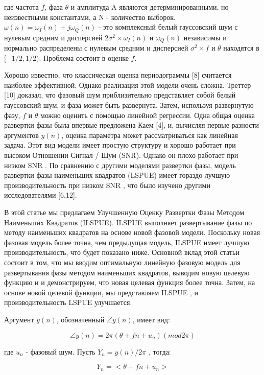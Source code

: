 где частота $f$, фаза $\theta$ и амплитуда A являются детерминированными, но неизвестными константами, а N - количество выборок. $\omega(n) = \omega_I(n) + j\omega_Q(n)$ - это комплексный белый гауссовский шум с нулевым средним и дисперсией $2\sigma^2 \times \omega_I (n)$ и $\omega_Q(n)$ независимы и нормально распределены с нулевым средним и дисперсией $\sigma^2 \times f$ и $ \theta$ находятся в $[- 1 / 2,1 / 2)$. Проблема состоит в оценке $f$.

Хорошо известно, что классическая оценка периодограммы [8] считается наиболее эффективной. Однако реализация этой модели очень сложна. Треттер [10] доказал, что фазовый шум приблизительно представляет собой белый гауссовский шум, и фаза может быть развернута. Затем, используя развернутую фазу, $f$ и $\theta$ можно оценить с помощью линейной регрессии. Одна общая оценка развертки фазы была впервые предложена Каем [4], и, вычисляя первые разности аргументов $y(n)$, оценка параметра может рассматриваться как линейная задача. Этот вид модели имеет простую структуру и хорошо работает при высоком Отношении Сигнал / Шум (SNR). Однако он плохо работает при низком SNR . По сравнению с другими моделями развертки фазы, модель развертки фазы наименьших квадратов (LSPUE) имеет гораздо лучшую производительность при низком SNR , что было изучено другими исследователями [6,12].

В этой статье мы предлагаем Улучшенную Оценку Развертки Фазы Методом Наименьших Квадратов (ILSPUE). ILSPUE выполняет
развертывание фазы по методу наименьших квадратов на основе новой фазовой модели. Поскольку новая фазовая модель более точна, чем предыдущая модель, ILSPUE  имеет лучшую производительность, что будет показано ниже. Основной вклад этой статьи состоит в том, что мы вводим оптимальную линейную фазовую модель для развертывания фазы методом наименьших квадратов, выводим новую целевую функцию и и демонстрируем, что новая целевая функция более точна. Затем, на основе новой целевой функции, мы представляем ILSPUE , и производительность LSPUE  улучшается.

Аргумент $y(n)$, обозначенный $\angle y(n)$, имеет вид:

\begin{equation}
\label{eq:equation1.42}	
	\angle y(n)=2 \pi(\theta+fn+u_n)(mod2 \pi)
\end{equation}

где $u_n$ - фазовый шум. Пусть $Y_n = y(n)/2 \pi$ , тогда:

\begin{equation}
\label{eq:equation1.43}	
	Y_n =<\theta+fn+u_n>
\end{equation}

